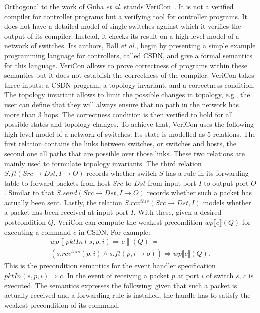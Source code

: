 Orthogonal to the work of Guha \emph{et al.} stands VeriCon~\cite{ball2014vericon}.
It is not a verified compiler for controller programs but a verifying tool for controller programs.
It does not have a detailed model of single switches against which it verifies the output of its compiler.
Instead, it checks its result on a high-level model of a network of switches.
Its authors, Ball \emph{et al.}, begin by presenting a simple example programming language for controllers, called CSDN, and give a formal semantics for this language.
VeriCon allows to prove correctness of programs within these semantics but it does not establish the correctness of the compiler.
VeriCon takes three inputs: a CSDN program, a topology invariant, and a correctness condition.
The topology invariant allows to limit the possible changes in topology, e.g., the user can define that they will always ensure that no path in the network has more than 3 hops.
The correctness condition is then verified to hold for all possible states and topology changes.
To achieve that, VeriCon uses the following high-level model of a network of switches: Its state is modelled as 5 relations.
The first relation contains the links between switches, or switches and hosts,
the second one all paths that are possible over those links.
These two relations are mainly used to formulate topology invariants.
The third relation $S.\mathit{ft}\left(\mathit{Src}\rightarrow\mathit{Dst}, I\rightarrow O\right)$ records whether switch $S$ has a rule in its forwarding table to forward packets from host $\mathit{Src}$ to $\mathit{Dst}$ from input port $I$ to output port $O$.
Similar to that $S.\mathit{send}\left(\mathit{Src}\rightarrow\mathit{Dst}, I\rightarrow O\right)$ records whether such a packet has actually been sent.
Lastly, the relation $S.\mathit{rcv}^\mathit{this}\left(\mathit{Src}\rightarrow\mathit{Dst}, I\right)$ models whether a packet has been received at input port $I$.
With these, given a desired postcondition $Q$, VeriCon can compute the weakest precondition $\mathit{wp}\llbracket c\rrbracket(Q)$ for executing a command $c$ in CSDN.
For example:
\begin{align}
	&\mathit{wp}\left\llbracket \mathit{pktIn}\left(s,p,i\right) \Rightarrow c\right\rrbracket\left(Q\right) \coloneqq \nonumber\\
	&\left(s.\mathit{rcv}^\mathit{this}\left(p,i\right) \wedge s.\mathit{ft}\left(p,i\rightarrow o\right)\right) \Longrightarrow \mathit{wp}\llbracket c\rrbracket\left(Q\right)\text{.}&
\end{align}
This is the precondition semantics for the event handler specification $\mathit{pktIn}(s,p,i) \Rightarrow c$. 
In the event of receiving a packet $p$ at port $i$ of switch $s$, $c$ is executed.
The semantics expresses the following: given that such a packet is actually received and a forwarding rule is installed, the handle has to satisfy the weakest precondition of its command.

